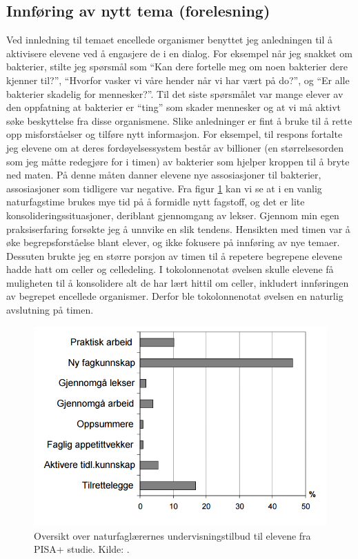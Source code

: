 \documentclass[main.tex]{subfiles}
\begin{document}
\subsection*{Innføring av nytt tema (forelesning)}
Ved innledning til temaet encellede organismer 
benyttet jeg anledningen til å aktivisere elevene ved å engasjere de i en dialog. For eksempel
når jeg snakket om bakterier, stilte jeg spørsmål som ``Kan dere fortelle meg om noen bakterier dere kjenner
til?'', ``Hvorfor vasker vi våre hender når vi har vært på do?'', og ``Er alle bakterier skadelig for mennesker?''.
Til det siste spørsmålet var mange elever av den oppfatning at bakterier er ``ting'' som skader mennesker og at vi
må aktivt søke beskyttelse fra disse organismene. Slike anledninger er fint å bruke til å rette opp 
misforståelser og tilføre nytt informasjon. For eksempel, til respons fortalte jeg elevene om at deres
fordøyelsessystem består av billioner (en størrelsesorden som jeg måtte redegjøre for i timen) av bakterier 
som hjelper kroppen til å bryte ned maten. På denne måten danner elevene nye assosiasjoner til bakterier,
assosiasjoner som tidligere var negative.
\newline
\newline
Fra figur \ref{fig:odeg10} kan vi se at i en vanlig naturfagstime brukes mye tid på å formidle 
nytt fagstoff, og det er lite konsolideringssituasjoner, deriblant gjennomgang av lekser. Gjennom
min egen praksiserfaring forsøkte jeg å unnvike en slik tendens. Hensikten med timen var å øke begrepsforståelse 
blant elever, og ikke fokusere på innføring av nye temaer. Dessuten brukte jeg en større porsjon 
av timen til å repetere begrepene elevene hadde hatt om celler og celledeling. I
tokolonnenotat øvelsen skulle elevene få muligheten til å konsolidere alt de har lært hittil
om celler, inkludert innføringen av begrepet encellede organismer. Derfor ble tokolonnenotat 
øvelsen en naturlig avslutning på timen.


\begin{figure}[h!]
\includegraphics[scale = 0.6]{../figures/undervisnings_aktivitet.png}
\caption{Oversikt over naturfaglærernes undervisningstilbud til elevene fra PISA+ studie. Kilde: 
\protect{}.}
\label{fig:odeg10}
\end{figure}
\end{document}
